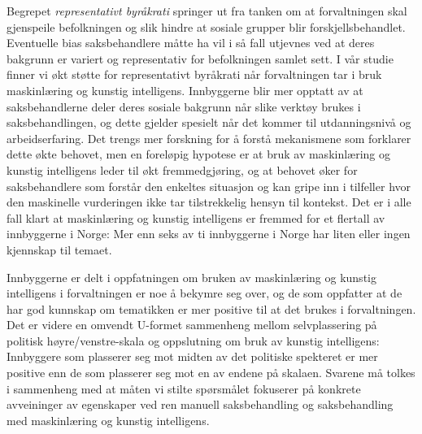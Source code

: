 \documentclass[
]{book}
\begin{document}
Begrepet \emph{representativt byråkrati} springer ut fra tanken om at forvaltningen skal gjenspeile befolkningen og slik hindre at sosiale grupper blir forskjellsbehandlet.
Eventuelle bias saksbehandlere måtte ha vil i så fall utjevnes ved at deres bakgrunn er variert og representativ for befolkningen samlet sett.
I vår studie finner vi økt støtte for representativt byråkrati når forvaltningen tar i bruk maskinlæring og kunstig intelligens.
Innbyggerne blir mer opptatt av at saksbehandlerne deler deres sosiale bakgrunn når slike verktøy brukes i saksbehandlingen, og dette gjelder spesielt når det kommer til utdanningsnivå og arbeidserfaring.
Det trengs mer forskning for å forstå mekanismene som forklarer dette økte behovet, men en foreløpig hypotese er at bruk av maskinlæring og kunstig intelligens leder til økt fremmedgjøring, og at behovet øker for saksbehandlere som forstår den enkeltes situasjon og kan gripe inn i tilfeller hvor den maskinelle vurderingen ikke tar tilstrekkelig hensyn til kontekst.
Det er i alle fall klart at maskinlæring og kunstig intelligens er fremmed for et flertall av innbyggerne i Norge:
Mer enn seks av ti innbyggerne i Norge har liten eller ingen kjennskap til temaet.

Innbyggerne er delt i oppfatningen om bruken av maskinlæring og kunstig intelligens i forvaltningen er noe å bekymre seg over, og de som oppfatter at de har god kunnskap om tematikken er mer positive til at det brukes i forvaltningen.
Det er videre en omvendt U-formet sammenheng mellom selvplassering på politisk høyre/venstre-skala og oppslutning om bruk av kunstig intelligens:
Innbyggere som plasserer seg mot midten av det politiske spekteret er mer positive enn de som plasserer seg mot en av endene på skalaen.
Svarene må tolkes i sammenheng med at måten vi stilte spørsmålet fokuserer på konkrete avveininger av egenskaper ved ren manuell saksbehandling og saksbehandling med maskinlæring og kunstig intelligens.
\end{document}

